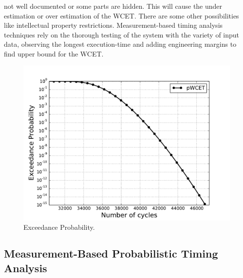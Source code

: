 not well documented or some parts are hidden. This will cause the under estimation or over estimation of the WCET. There are some other possibilities like intellectual property restrictions. Measurement-based timing analysis techniques rely on the thorough testing of the system with the variety of input data, observing the longest execution-time and adding engineering  margins to find upper bound for the WCET. 
\begin{figure}[tb!]
\includegraphics[scale=0.75]{figures/pwcet.pdf}
\caption{Exceedance Probability.}
\label{exceedance}
\end{figure}

 

\subsection{Measurement-Based Probabilistic Timing Analysis}

